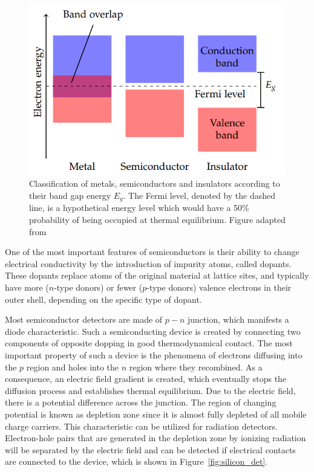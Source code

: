\begin{figure}[h]
\centering
\includegraphics[scale=0.7]{figures/bound_gap.PNG}
\caption{Classification of metals, semiconductors and insulators according to their
band gap energy $E_g$. The Fermi level, denoted by the dashed line, is a hypothetical energy level which would have a 50\% probability of being occupied at thermal equilibrium.  Figure adapted from~\cite{radiation_damage}}
\label{fig:boundgap}
\end{figure}

One of the most important features of semiconductors is their ability to change electrical conductivity by the introduction of impurity atoms, called dopants. These dopants replace atoms of the original material at lattice sites, and typically have more ($n$-type donors) or fewer ($p$-type donors) valence electrons in their outer shell, depending on the specific type of dopant. 


Most semiconductor detectors are made of $p-n$ junction, which manifests a diode characteristic. Such a semiconducting device is created by connecting two components of opposite dopping in good thermodynamical contact. The most important property of such a device is the phenomena of electrons diffusing into the $p$ region and holes into the $n$ region where they recombined. As a consequence, an electric field gradient is created, which eventually stops the diffusion process and establishes thermal equilibrium. Due to the electric field, there is a potential difference across the junction. The region of changing potential is known as depletion zone since it is almost fully depleted of all mobile charge carriers. This characteristic can be utilized for radiation detectors. Electron-hole pairs that are generated in the depletion zone by ionizing radiation will be separated by the electric field and can be detected if electrical contacts are connected to the device, which is shown in Figure~\ref{fig:silicon_det}.

